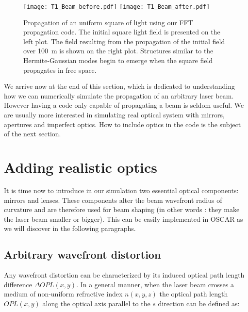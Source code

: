 
\begin{figure}
\begin{center}
\texttt{[image: T1\_Beam\_before.pdf]}\hfill
\texttt{[image: T1\_Beam\_after.pdf]}
\end{center}
\caption{\label{fig4:FFTsquare} Propagation of an uniform square of light using our FFT propagation code. The initial square light field is presented on the left plot. The field resulting from the propagation of the initial field over 100~m is shown on the right plot. Structures similar to the Hermite-Gaussian modes begin to emerge when the square field propagates in free space.}
\end{figure}

We arrive now at the end of this section, which is dedicated to understanding how we can numerically simulate the propagation of an arbitrary laser beam. However having a code only capable of propagating a beam is seldom useful. We are usually more interested in simulating real optical system with mirrors, apertures and imperfect optics. How to include optics in the code is the subject of the next section.\\

\clearpage


\section{Adding realistic optics}
\label{sec1.3}

It is time now to introduce in our simulation two essential optical components: mirrors and lenses. These components alter the beam wavefront radius of curvature and are therefore used for beam shaping (in other words : they make the laser beam smaller or bigger). This can be easily implemented in OSCAR as we will discover in the following paragraphs.



\subsection{Arbitrary wavefront distortion}

Any wavefront distortion can be characterized by its induced optical path length difference $\Delta OPL(x,y)$. In a general manner, when the laser beam crosses a medium of non-uniform refractive index $n(x,y,z)$ the optical path length $OPL(x,y)$ along the optical axis parallel to the $s$ direction can be defined as:


